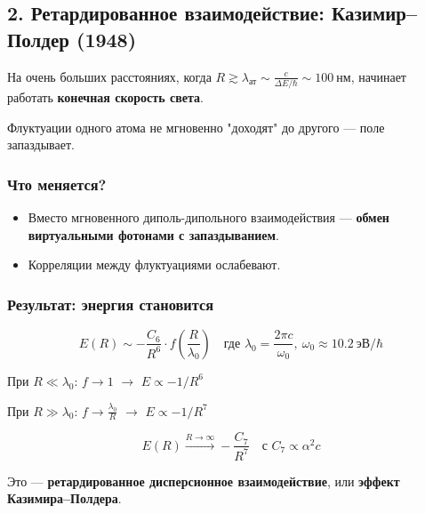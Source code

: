\documentclass[11pt]{article}
\providecommand{\tightlist}{%
      \setlength{\itemsep}{0pt}\setlength{\parskip}{0pt}}
\begin{document}
\subsection{2. Ретардированное взаимодействие: Казимир--Полдер
(1948)}\label{ux440ux435ux442ux430ux440ux434ux438ux440ux43eux432ux430ux43dux43dux43eux435-ux432ux437ux430ux438ux43cux43eux434ux435ux439ux441ux442ux432ux438ux435-ux43aux430ux437ux438ux43cux438ux440ux43fux43eux43bux434ux435ux440-1948}

На очень больших расстояниях, когда
\(R \gtrsim \lambda_{\text{ат}} \sim \frac{c}{\Delta E / \hbar} \sim 100~\text{нм}\),
начинает работать \textbf{конечная скорость света}.

Флуктуации одного атома не мгновенно "доходят" до другого --- поле
запаздывает.

\subsubsection{Что
меняется?}\label{ux447ux442ux43e-ux43cux435ux43dux44fux435ux442ux441ux44f}

\begin{itemize}
\tightlist
\item
  Вместо мгновенного диполь-дипольного взаимодействия --- \textbf{обмен
  виртуальными фотонами с запаздыванием}.
\item
  Корреляции между флуктуациями ослабевают.
\end{itemize}

\subsubsection{Результат: энергия
становится}\label{ux440ux435ux437ux443ux43bux44cux442ux430ux442-ux44dux43dux435ux440ux433ux438ux44f-ux441ux442ux430ux43dux43eux432ux438ux442ux441ux44f}

\[
E(R) \sim -\frac{C_6}{R^6} \cdot f\left( \frac{R}{\lambda_0} \right)
\quad \text{где } \lambda_0 = \frac{2\pi c}{\omega_0},\ \omega_0 \approx 10.2~\text{эВ}/\hbar
\]

При \(R \ll \lambda_0\): \(f \to 1\) $\rightarrow$ \(E \propto -1/R^6\)

При \(R \gg \lambda_0\): \(f \to \frac{\lambda_0}{R}\) $\rightarrow$
\(E \propto -1/R^7\)

\[
\boxed{E(R) \xrightarrow{R \to \infty} -\frac{C_7}{R^7}}
\quad \text{с } C_7 \propto \alpha^2 c
\]

Это --- \textbf{ретардированное дисперсионное взаимодействие}, или
\textbf{эффект Казимира--Полдера}.
\end{document}
